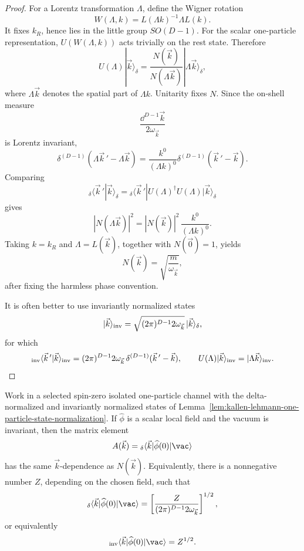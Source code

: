 \begin{proof}
For a Lorentz transformation \(\Lambda\), define the Wigner rotation
\[
  W(\Lambda,k)=L(\Lambda k)^{-1}\Lambda L(k).
\]
It fixes \(k_R\), hence lies in the little group \(SO(D-1)\). For the scalar
one-particle representation, \(U(W(\Lambda,k))\) acts trivially on the rest
state. Therefore
\[
  U(\Lambda)|\vec k\rangle_\delta
  =
  \frac{N(\vec k)}{N(\Lambda\vec k)}
  |\Lambda\vec k\rangle_\delta,
\]
where \(\Lambda\vec k\) denotes the spatial part of \(\Lambda k\).
Unitarity fixes \(N\). Since the on-shell measure
\[
  \frac{\dd^{D-1}\vec k}{2\omega_{\vec k}}
\]
is Lorentz invariant,
\[
  \delta^{(D-1)}(\Lambda\vec k\,{}'-\Lambda\vec k)
  =
  \frac{k^0}{(\Lambda k)^0}
  \delta^{(D-1)}(\vec k\,{}'-\vec k).
\]
Comparing
\[
  {}_\delta\langle\vec k\,{}'|\vec k\rangle_\delta
  =
  {}_\delta\langle\vec k\,{}'|U(\Lambda)^\dagger U(\Lambda)|\vec k\rangle_\delta
\]
gives
\[
  |N(\Lambda\vec k)|^2
  =
  |N(\vec k)|^2\,\frac{k^0}{(\Lambda k)^0}.
\]
Taking \(k=k_R\) and \(\Lambda=L(\vec k)\), together with \(N(\vec0)=1\),
yields
\[
  N(\vec k)=\sqrt{\frac{m}{\omega_{\vec k}}},
\]
after fixing the harmless phase convention.

It is often better to use invariantly normalized states
\[
  |\vec k\rangle_{\rm inv}
  =
  \sqrt{(2\pi)^{D-1}2\omega_{\vec k}}\,
  |\vec k\rangle_\delta,
\]
for which
\[
  {}_{\rm inv}\langle\vec k\,{}'|\vec k\rangle_{\rm inv}
  =
  (2\pi)^{D-1}2\omega_{\vec k}\,
  \delta^{(D-1)}(\vec k\,{}'-\vec k),
  \qquad
  U(\Lambda)|\vec k\rangle_{\rm inv}=|\Lambda\vec k\rangle_{\rm inv}.
\]
\end{proof}

\begin{proposition}
\label{prop:kallen-lehmann-scalar-field-one-particle-matrix-element}
Work in a selected spin-zero isolated one-particle channel with the
delta-normalized and invariantly normalized states of
Lemma~\ref{lem:kallen-lehmann-one-particle-state-normalization}.  If
\(\widehat\phi\) is a scalar local field and the vacuum is invariant, then the
matrix element
\[
  A(\vec k)
  =
  {}_\delta\langle\vec k|\widehat\phi(0)|\vac\rangle
\]
has the same \(\vec k\)-dependence as \(N(\vec k)\).  Equivalently, there is
a nonnegative number \(Z\), depending on the chosen field, such that
\[
  {}_\delta\langle\vec k|\widehat\phi(0)|\vac\rangle
  =
  \left[
    \frac{Z}{(2\pi)^{D-1}2\omega_{\vec k}}
  \right]^{1/2},
\]
or equivalently
\[
  {}_{\rm inv}\langle\vec k|\widehat\phi(0)|\vac\rangle
  =
  Z^{1/2}.
\]
\end{proposition}

